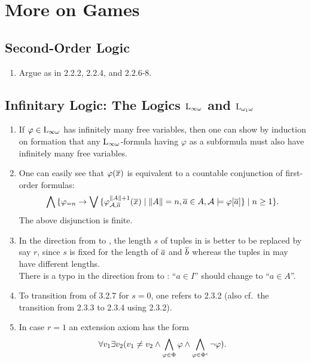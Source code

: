 \setcounter{chapter}{2}
\chapter{More on Games}
\section{Second-Order Logic}
\begin{enumerate}[1.]
%
\item {} Argue as in 2.2.2, 2.2.4, and 2.2.6-8.
%
\end{enumerate}


\section{Infinitary Logic: The Logics $\Logic{\infty\omega}$ and $\Logic{\omega_1\omega}$}
\begin{enumerate}[1.]
%
\item {} If $\varphi \in \Logic{\infty\omega}$ has infinitely many free variables, then one can show by induction on formation that any $\Logic{\infty\omega}$-formula having $\varphi$ as a subformula must also have infinitely many free variables.
%
\item {} One can easily see that $\varphi(\overline{x})$ is equivalent to a countable conjunction of first-order formulas:
\[
\bigwedge {\{\varphi_{= n} \rightarrow\bigvee{\{\varphi^{\|A\| + 1}_{\mathcal{A}, \overline{a}}(\overline{x}) \mid \|A\| = n, \overline{a} \in A, \mathcal{A} \models\varphi[\overline{a}]\}} \mid n \geq 1\}}.
\]
The above disjunction is finite.
%
\item {} In the direction from  to , the length $s$ of tuples in  is better to be replaced by say $r$, since $s$ is fixed for the length of $\overline{a}$ and $\overline{b}$ whereas the tuples in  may have different lengths.
\medskip\\
There is a typo in the direction from  to : ``$a \in I$'' should change to ``$a \in A$''.
%
\item {} To transition from  of 3.2.7 for $s = 0$, one refers to 2.3.2 (also cf.\ the transition from 2.3.3 to 2.3.4 using 2.3.2).
%
\item {} In case $r = 1$ an extension axiom has the form
\[
\forall v_1 \exists v_2 (v_1 \neq v_2 \land \bigwedge_{\varphi \in \Phi} \varphi \land \bigwedge_{\varphi \in \Phi^\mathit{c}} \neg\varphi).
\]
%
\end{enumerate}
